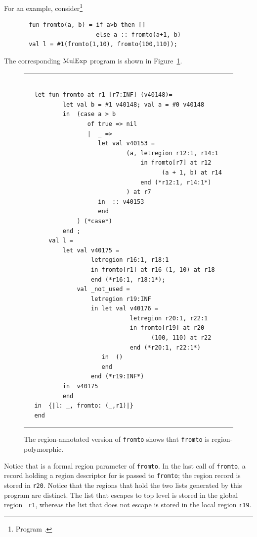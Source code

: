 \documentclass[12pt]{book}
\begin{document}
For an example, consider\footnote{Program .}
\begin{verbatim}
       fun fromto(a, b) = if a>b then []
                          else a :: fromto(a+1, b)
       val l = #1(fromto(1,10), fromto(100,110));
\end{verbatim}
The corresponding $\hbox{\rm MulExp}$ program is shown in Figure~\ref{fromto.fig}.
\begin{figure}
\hrule
\begin{verbatim}

   let fun fromto at r1 [r7:INF] (v40148)= 
           let val b = #1 v40148; val a = #0 v40148
           in  (case a > b 
                  of true => nil
                  |  _ => 
                     let val v40153 = 
                             (a, letregion r12:1, r14:1 
                                 in fromto[r7] at r12 
                                       (a + 1, b) at r14 
                                 end (*r12:1, r14:1*)
                             ) at r7
                     in  :: v40153
                     end 
               ) (*case*) 
           end ; 
       val l = 
           let val v40175 = 
                   letregion r16:1, r18:1 
                   in fromto[r1] at r16 (1, 10) at r18 
                   end (*r16:1, r18:1*); 
               val _not_used = 
                   letregion r19:INF 
                   in let val v40176 = 
                              letregion r20:1, r22:1 
                              in fromto[r19] at r20 
                                    (100, 110) at r22 
                              end (*r20:1, r22:1*)
                      in  ()
                      end  
                   end (*r19:INF*)
           in  v40175
           end 
   in  {|l: _, fromto: (_,r1)|}
   end 
\end{verbatim}
\caption{The region-annotated version of {\tt fromto} shows that {\tt fromto}
is region-polymorphic.}
\medskip

\hrule
\label{fromto.fig}
\end{figure}
Notice that  is a formal region parameter of {\tt fromto}.
In the last call of {\tt fromto}, a record holding a
region descriptor for  is passed to {\tt fromto};
the region record is stored in {\tt r20}. Notice that the regions that hold
the two lists generated by this program are distinct. 
The list that escapes to top level is stored in the global region {\tt
  r1}, whereas the list that does not escape is stored in the local
region {\tt r19}.
\end{document}
